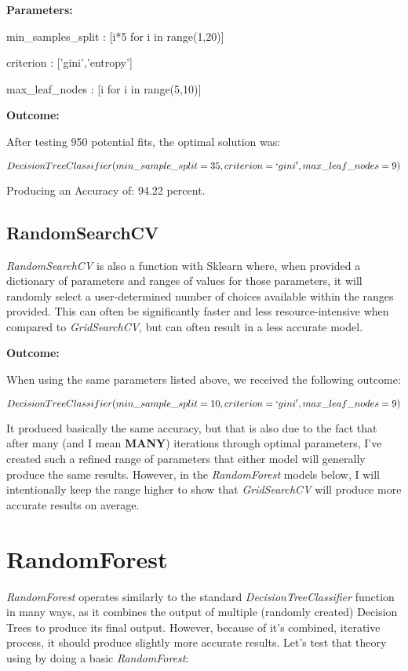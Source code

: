 \documentclass[notitlepage]{report}
\begin{document}
\textbf{Parameters:}

\qquad min\_samples\_split : [i*5 for i in range(1,20)]

\qquad criterion : ['gini','entropy']

\qquad max\_leaf\_nodes : [i for i in range(5,10)]

\textbf{Outcome:}

After testing 950 potential fits, the optimal solution was:

$$
DecisionTreeClassifier(min\_sample\_split=35,criterion=`gini',max\_leaf\_nodes=9)
$$

Producing an Accuracy of: 94.22 percent.

\subsection*{RandomSearchCV}
\textit{RandomSearchCV} is also a function with Sklearn where, when provided a dictionary of parameters and ranges of values for those parameters, it will randomly select a user-determined number of choices available within the ranges provided. This can often be significantly faster and less resource-intensive when compared to \textit{GridSearchCV}, but can often result in a less accurate model.

\textbf{Outcome:}

When using the same parameters listed above, we received the following outcome:

$$
DecisionTreeClassifier(min\_sample\_split=10,criterion=`gini',max\_leaf\_nodes=9)
$$

It produced basically the same accuracy, but that is also due to the fact that after many (and I mean \textbf{MANY}) iterations through optimal parameters, I've created such a refined range of parameters that either model will generally produce the same results. However, in the \textit{RandomForest} models below, I will intentionally keep the range higher to show that \textit{GridSearchCV} will produce more accurate results on average.

\section*{RandomForest}
\textit{RandomForest} operates similarly to the standard \textit{DecisionTreeClassifier} function in many ways, as it combines the output of multiple (randomly created) Decision Trees to produce its final output. However, because of it's combined, iterative process, it should produce slightly more accurate results. Let's test that theory using by doing a basic \textit{RandomForest}:
\end{document}
